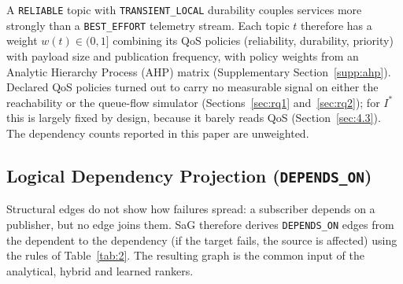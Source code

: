 \documentclass[preprint,3p]{elsarticle}
\begin{document}
A \texttt{RELIABLE} topic with \texttt{TRANSIENT\_LOCAL} durability couples services more strongly than a \texttt{BEST\_EFFORT} telemetry stream. Each topic $t$ therefore has a weight $w(t) \in (0, 1]$ combining its QoS policies (reliability, durability, priority) with payload size and publication frequency, with policy weights from an Analytic Hierarchy Process (AHP) \cite{saaty1980ahp} matrix (Supplementary Section~\ref{supp:ahp}). Declared QoS policies turned out to carry no measurable signal on either the reachability or the queue-flow simulator (Sections~\ref{sec:rq1} and~\ref{sec:rq2}); for $I^*$ this is largely fixed by design, because it barely reads QoS (Section~\ref{sec:4.3}). The dependency counts reported in this paper are unweighted.

\subsection{Logical Dependency Projection (\texttt{DEPENDS\_ON})}
\label{sec:3.3}

Structural edges do not show how failures spread: a subscriber depends on a publisher, but no edge joins them. SaG therefore derives \texttt{DEPENDS\_ON} edges from the dependent to the dependency (if the target fails, the source is affected) using the rules of Table~\ref{tab:2}. The resulting graph is the common input of the analytical, hybrid and learned rankers.

\begin{table}[htbp]
\centering
\small
\caption{The \texttt{DEPENDS\_ON} rules of the Application--Library projection evaluated in this study. Four infrastructure rules (Rules~2--4 and~6, for brokers and hosts) are formalized in Supplementary Section~\ref{supp:weights} but are not exercised by the Application-level evaluation.}
\label{tab:2}
\end{table}
\end{document}
